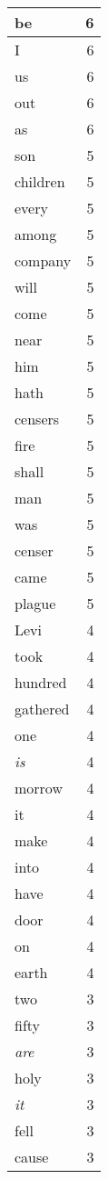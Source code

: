 \begin{center}
\begin{longtable}{l|r}
be & 6 \\ \hline
I & 6 \\ \hline
us & 6 \\ \hline
out & 6 \\ \hline
as & 6 \\ \hline
son & 5 \\ \hline
children & 5 \\ \hline
every & 5 \\ \hline
among & 5 \\ \hline
company & 5 \\ \hline
will & 5 \\ \hline
come & 5 \\ \hline
near & 5 \\ \hline
him & 5 \\ \hline
hath & 5 \\ \hline
censers & 5 \\ \hline
fire & 5 \\ \hline
shall & 5 \\ \hline
man & 5 \\ \hline
was & 5 \\ \hline
censer & 5 \\ \hline
came & 5 \\ \hline
plague & 5 \\ \hline
Levi & 4 \\ \hline
took & 4 \\ \hline
hundred & 4 \\ \hline
gathered & 4 \\ \hline
one & 4 \\ \hline
\emph{is} & 4 \\ \hline
morrow & 4 \\ \hline
it & 4 \\ \hline
make & 4 \\ \hline
into & 4 \\ \hline
have & 4 \\ \hline
door & 4 \\ \hline
on & 4 \\ \hline
earth & 4 \\ \hline
two & 3 \\ \hline
fifty & 3 \\ \hline
\emph{are} & 3 \\ \hline
holy & 3 \\ \hline
\emph{it} & 3 \\ \hline
fell & 3 \\ \hline
cause & 3 \\ \hline

\end{longtable}
\end{center}
